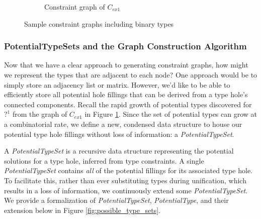 \begin{figure}[htb!]
\begin{subfigure}{.49\textwidth}
\caption{Constraint graph of $C_{ex1}$}
\label{fig:C-ex-graph-traversal}
\end{subfigure}
\caption{Sample constraint graphs including binary types}
\label{fig:ex1ex2graphs}
\end{figure}

\subsubsection{PotentialTypeSets and the Graph Construction Algorithm}
Now that we have a clear approach to generating constraint graphs, how might we represent the types that are adjacent to each node? One approach would be to simply store an adjacency list or matrix. However, we'd like to be able to efficiently store all potential hole fillings that can be derived from a type hole's connected components. Recall the rapid growth of potential types discovered for $?^1$ from the graph of $C_{ex1}$ in Figure \ref{fig:C-ex-graph-traversal}. Since the set of potential types can grow at a combinatorial rate, we define a new, condensed data structure to house our potential type hole fillings without loss of information: a \emph{PotentialTypeSet}.

A \textit{PotentialTypeSet} is a recursive data structure representing the potential solutions for a type hole, inferred from type constraints. A single \emph{PotentialTypeSet} contains \emph{all} of the potential fillings for its associated type hole. To facilitate this, rather than ever substituting types during unification, which results in a loss of information, we continuously extend some \emph{PotentialTypeSet}. We provide a formalization of \textit{PotentialTypeSet}, \textit{PotentialType}, and their extension below in Figure \ref{fig:possible_type_sets}.

